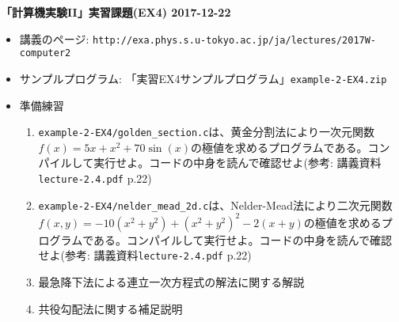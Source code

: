 \documentclass[11pt]{jarticle}
\begin{document}
\noindent
{\bf\large 「計算機実験II」実習課題(EX4) 2017-12-22}
\\[-0.5em]

\noindent
\begin{itemize}
\item 講義のページ: \verb+http://exa.phys.s.u-tokyo.ac.jp/ja/lectures/2017W-computer2+

\item サンプルプログラム: 「実習EX4サンプルプログラム」{\tt example-2-EX4.zip}

\item 準備練習
  
\begin{enumerate}
  \item {\tt example-2-EX4/golden\_section.c}は、黄金分割法により一次元関数$f(x) = 5x+x^2+70\sin(x)$の極値を求めるプログラムである。コンパイルして実行せよ。コードの中身を読んで確認せよ(参考: 講義資料{\tt lecture-2.4.pdf} p.22)
  \item {\tt example-2-EX4/nelder\_mead\_2d.c}は、Nelder-Mead法により二次元関数$f(x, y) = −10(x^2 + y^2) + (x^2 + y^2)^2 − 2(x + y)$の極値を求めるプログラムである。コンパイルして実行せよ。コードの中身を読んで確認せよ(参考: 講義資料{\tt lecture-2.4.pdf} p.22)
  \item 最急降下法による連立一次方程式の解法に関する解説
  \item 共役勾配法に関する補足説明
\end{enumerate}


\end{itemize}
\end{document}
